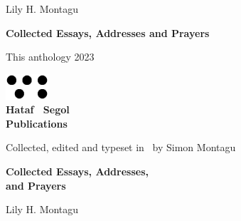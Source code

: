 \frontmatter
\pagestyle{empty}

\vspace*{2\baselineskip}
\begin{center}
  Lily H. Montagu

  \vspace*{2\baselineskip}
  \textbf{Collected Essays, Addresses and Prayers}
\end{center}

\clearpage

\begin{center}
  \vspace{2\baselineskip}
  
  This anthology 2023
  \vspace*{22\baselineskip}

  \includegraphics[width=16mm]{hatafSegolLogoNoText.png}\\
  
  {
    \Large\bfseries Hataf \ Segol\\Publications
  }

  \vspace{1\baselineskip}
  \small
  Collected, edited and typeset in \XeLaTeX\ by Simon Montagu
  \end{center}

\clearpage
 
{
  \vspace*{4\baselineskip}

  \centering\LARGE\bfseries Collected Essays, Addresses,\\ and Prayers

  \vspace{2\baselineskip}

  \Large Lily H. Montagu
  
}

\cleardoublepage
\tableofcontents*

\clearpage
\clearpage
